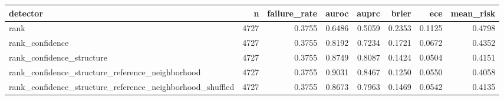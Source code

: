 \begin{tabular}{lrrrrrrr}
\toprule
detector & n & failure\_rate & auroc & auprc & brier & ece & mean\_risk \\
\midrule
rank & 4727 & 0.3755 & 0.6486 & 0.5059 & 0.2353 & 0.1125 & 0.4798 \\
rank\_confidence & 4727 & 0.3755 & 0.8192 & 0.7234 & 0.1721 & 0.0672 & 0.4352 \\
rank\_confidence\_structure & 4727 & 0.3755 & 0.8749 & 0.8087 & 0.1424 & 0.0504 & 0.4151 \\
rank\_confidence\_structure\_reference\_neighborhood & 4727 & 0.3755 & 0.9031 & 0.8467 & 0.1250 & 0.0550 & 0.4058 \\
rank\_confidence\_structure\_reference\_neighborhood\_shuffled & 4727 & 0.3755 & 0.8673 & 0.7963 & 0.1469 & 0.0542 & 0.4135 \\
\bottomrule
\end{tabular}
